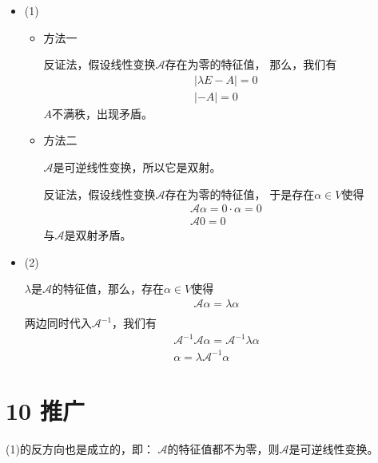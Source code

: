 \documentclass{article}
\begin{document}
\begin{itemize}
  \item (1)

        \begin{itemize}
          \item 方法一

                反证法，假设线性变换$\mathscr{A}$存在为零的特征值，
                那么，我们有
                \begin{align*}
                  |\lambda E - A| = 0 \\
                  |-A| = 0
                \end{align*}
                $A$不满秩，出现矛盾。

          \item 方法二

                $\mathscr{A}$是可逆线性变换，所以它是双射。

                反证法，假设线性变换$\mathscr{A}$存在为零的特征值，
                于是存在$\alpha \in V$使得
                \begin{align*}
                  \mathscr{A} \alpha = 0 \cdot \alpha = 0 \\
                  \mathscr{A} 0 = 0
                \end{align*}
                与$\mathscr{A}$是双射矛盾。
        \end{itemize}

  \item (2)

        $\lambda$是$\mathscr{A}$的特征值，那么，存在$\alpha \in V$使得
        \begin{align*}
          \mathscr{A} \alpha = \lambda \alpha \\
        \end{align*}
        两边同时代入$\mathscr{A}^{-1}$，我们有
        \begin{align*}
          \mathscr{A}^{-1} \mathscr{A} \alpha = \mathscr{A}^{-1} \lambda \alpha \\
          \alpha = \lambda \mathscr{A}^{-1} \alpha
        \end{align*}
\end{itemize}

\section*{10 推广}

(1)的反方向也是成立的，即：
$\mathscr{A}$的特征值都不为零，则$\mathscr{A}$是可逆线性变换。
\end{document}
